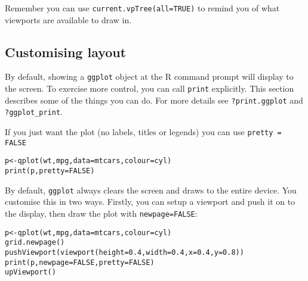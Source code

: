 % 
% 
% 
% 
% 
% 
Remember you can use {\tt current.vpTree(all=TRUE)} to remind you of what viewports are available to draw in.

\subsection{Customising layout}\label{sec:controlling_output}

By default, showing a {\tt ggplot} object at the R command prompt will display to the screen.  To exercise more control, you can call {\tt print} explicitly.  This section describes some of the things you can do.  For more details see {\tt ?print.ggplot} and {\tt ?ggplot\_print}.

If you just want the plot (no labels, titles or legends) you can use {\tt pretty = FALSE}

\begin{alltt}
p <- qplot(wt, mpg, data=mtcars, colour=cyl)
print(p, pretty = FALSE)
\end{alltt}

By default, {\tt ggplot} always clears the screen and draws to the entire device.  You customise this in two ways.  Firstly, you can setup a viewport and push it on to the display, then draw the plot with {\tt newpage=FALSE}:

\begin{alltt}
p <- qplot(wt, mpg, data=mtcars, colour=cyl)
grid.newpage()
pushViewport(viewport(height=0.4, width=0.4, x=0.4, y=0.8))
print(p, newpage=FALSE, pretty=FALSE)
upViewport()
\end{alltt}

